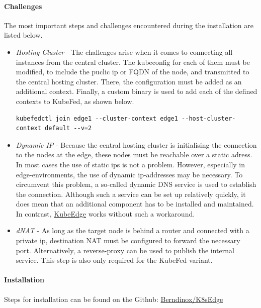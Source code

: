 \documentclass[MSC,Master,english]{twbook}%
\begin{document}
\paragraph{Challenges} The most important steps and challenges encountered during the installation are listed below.

\begin{itemize}
    \item \textit{Hosting Cluster} - The challenges arise when it comes to connecting all instances from the central cluster. The kubeconfig for each of them must be modified, to include the puclic ip or \ac{FQDN} of the node, and transmitted to the central hosting cluster. There, the configuration must be added as an additional context. Finally, a custom binary is used to add each of the defined contexts to \ac{KubeFed}, as shown below.

    \begin{lstlisting}[caption={KubeFed join context},captionpos=b]
    kubefedctl join edge1 --cluster-context edge1 --host-cluster-context default --v=2
    \end{lstlisting}

    \item \textit{Dynamic IP} - Because the central hosting cluster is initialising the connection to the  nodes at the edge, these nodes must be reachable over a static adress. In most cases the use of static ips is not a problem. However, especially in edge-environments, the use of dynamic ip-addresses may be necessary. To circumvent this problem, a so-called dynamic \ac{DNS} service is used to establish the connection. Although such a service can be set up relatively quickly, it does mean that an additional component has to be installed and maintained. In contrast, \hyperref[sec:dsrenvke]{KubeEdge} works without such a workaround.
    
    \item \textit{dNAT} - As long as the target node is behind a router and connected with a private ip, destination \ac{NAT} must be configured to forward the necessary port. Alternatively, a reverse-proxy can be used to publish the internal service. This step is also only required for the KubeFed variant. 
\end{itemize}
\paragraph{Installation} Steps for installation can be found on the Github: \hyperref{https://github.com/Berndinox/K8sEdge/blob/main/DOCs/kubefed-install.md}{}{}{Berndinox/K8sEdge} \cite{bk-gh-kf-install}
\end{document}
